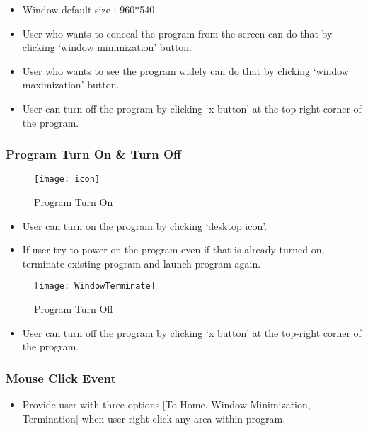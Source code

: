 \documentclass[conference,compsoc, twocolumn]{IEEEtran}
\begin{document}
\begin{itemize}
\item Window default size : 960*540
\item User who wants to conceal the program from the screen can do that by clicking ‘window minimization’ button.
\item User who wants to see the program widely can do that by clicking ‘window maximization’ button.
\item User can turn off the program by clicking ‘x button’ at the top-right corner of  the program.
\end{itemize}


\subsubsection{Program Turn On \& Turn Off}
\begin{figure}[h]
\centering\texttt{[image: icon]}
\caption{Program Turn On}
\end{figure}

\begin{itemize}
\item User can turn on the program by clicking ‘desktop icon’.
\item If user try to power on the program even if that is already turned on, terminate existing program and launch program again.
\end{itemize}

\begin{figure}[h]
\centering\texttt{[image: WindowTerminate]}
\caption{Program Turn Off}
\end{figure}

\begin{itemize}
\item User can turn off the program by clicking ‘x button’ at the top-right corner of  the program.
\end{itemize}


\subsubsection{Mouse Click Event}
\begin{itemize}
\item Provide user with three options [To Home, Window Minimization, Termination] when user right-click any area within program.
\end{itemize}
\end{document}
